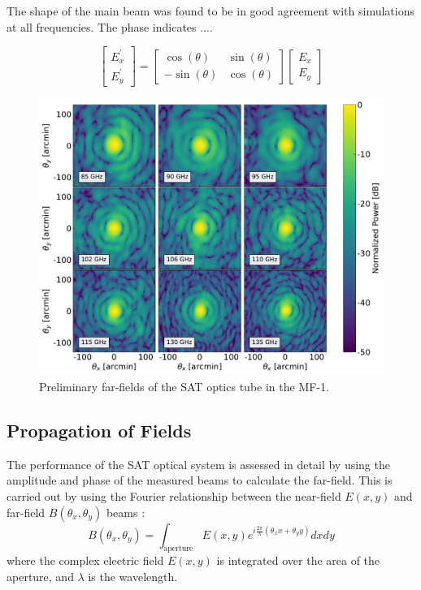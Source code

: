 The shape of the main beam was found to be in good agreement with simulations at all frequencies.  The phase indicates ....  

\begin{equation}
\begin{bmatrix}
 E_x^{'} \\
 E_y^{'}
 \end{bmatrix} = 
\begin{bmatrix}
 \cos(\theta) & \sin(\theta) \\
 -\sin(\theta) & \cos(\theta)
 \end{bmatrix}
\begin{bmatrix}
 E_x \\
 E_y
 \end{bmatrix}
 \end{equation}

 \begin{figure}[ht!]
    \centering
    \includegraphics[width = .75\textwidth]{Figures/farfield_sat.pdf}
    \caption{Preliminary far-fields of the SAT optics tube in the MF-1.}
    \label{fig:farfields_sat}
\end{figure}

\subsection{Propagation of Fields}
\label{sec:sat_prop_fields}

The performance of the SAT optical system is assessed in detail by using the amplitude and phase of the measured beams to calculate the far-field.  This is carried out by using the Fourier relationship between the near-field $E(x,y)$ and far-field $B(\theta_x,\theta_y)$ beams \cite{McIntosh2016,alma_holog}:
\begin{equation}
    B(\theta_x,\theta_y) = \int_{\text{aperture}} E(x,y) e^{ i \frac{2\pi}{\lambda} (\theta_x x + \theta_y y )} dx dy 
\end{equation}
where the complex electric field $E(x,y)$ is integrated over the area of the aperture, and $\lambda$ is the wavelength.

